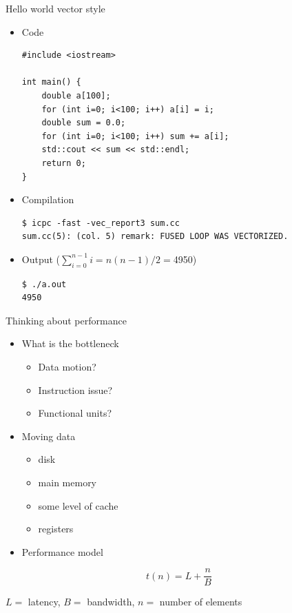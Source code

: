 \begin{frame}[fragile]{Hello world vector style}
\begin{itemize}
\item Code
{\small
\begin{verbatim}
#include <iostream>

int main() {
    double a[100];
    for (int i=0; i<100; i++) a[i] = i;
    double sum = 0.0;
    for (int i=0; i<100; i++) sum += a[i];
    std::cout << sum << std::endl;
    return 0;
}
\end{verbatim}
}
\item Compilation
\begin{verbatim}
$ icpc -fast -vec_report3 sum.cc                                            
sum.cc(5): (col. 5) remark: FUSED LOOP WAS VECTORIZED.  
\end{verbatim}
\item Output ($\sum_{i=0}^{n-1} i = n(n-1)/2 = $4950)
\begin{verbatim}
$ ./a.out                                                                   
4950                        
\end{verbatim}
\end{itemize}
\end{frame}


\begin{frame}{Thinking about performance}
  \begin{itemize}
  \item What is the bottleneck
    \begin{itemize}
    \item Data motion?
    \item Instruction issue?
    \item Functional units?  
    \end{itemize}

  \item Moving data
    \begin{itemize}
    \item disk
    \item main memory
    \item some level of cache
    \item registers
    \end{itemize}
  \item Performance model
  \end{itemize}
\[
    t(n) = L + \frac{n}{B}
\]

\begin{center}
$L = $ latency, $B = $ bandwidth, $n = $ number of elements
\end{center}



\end{frame}



